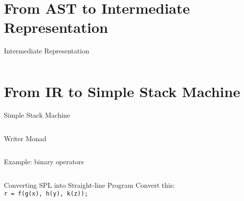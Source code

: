 \documentclass[department=icis, slidenumbers=slide, official=true]{beamerruhuisstijl}
\begin{document}
\section{From AST to Intermediate Representation}
\begin{frame}{Intermediate Representation}
    \fontsize{8pt}{12}\selectfont
    \pause
    \inputminted{Haskell}{examples/ir_instructions.hs}
\end{frame}

\section{From IR to Simple Stack Machine}
\begin{frame}{Simple Stack Machine}
    \fontsize{8pt}{9}\selectfont


    \pause
    \begin{multicols}{3}
        \inputminted{Haskell}{examples/ssm.hs}
    \end{multicols}

\end{frame}

\begin{frame}{Writer Monad}
    \pause
    \inputminted{Haskell}{examples/ssm_monad.hs}
\end{frame}

\begin{frame}{Example: binary operators}
    \fontsize{8pt}{9}\selectfont
    \pause
    \inputminted{Haskell}{examples/binop_to_ssm.hs}
\end{frame}

\begin{frame}{Converting SPL into Straight-line Program}
    \vspace{30pt}
    Convert this: \\
    \texttt{r = f(g(x), h(y), k(z));}

    \vspace{30pt}
\end{frame}
\end{document}
